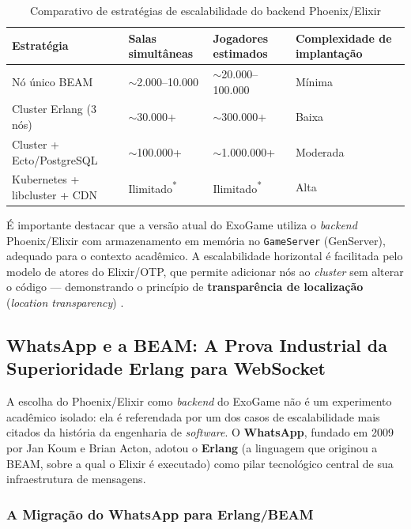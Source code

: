 \documentclass[
	12pt,
	openany,
	oneside,
	a4paper,
	english,
	brazil
]{abntex2}
\begin{document}
\begin{table}[htb]
\caption{\label{tab:escalabilidade}Comparativo de estratégias de escalabilidade do backend Phoenix/Elixir}
\begin{tabular}{p{3cm}|p{3cm}|p{3cm}|p{3.5cm}}
  \toprule
  \textbf{Estratégia} & \textbf{Salas simultâneas} & \textbf{Jogadores estimados} & \textbf{Complexidade de implantação} \\
  \midrule
  Nó único BEAM & $\sim$2.000--10.000 & $\sim$20.000--100.000 & Mínima \\
  \midrule
  Cluster Erlang (3 nós) & $\sim$30.000+ & $\sim$300.000+ & Baixa \\
  \midrule
  Cluster + Ecto/PostgreSQL & $\sim$100.000+ & $\sim$1.000.000+ & Moderada \\
  \midrule
  Kubernetes + libcluster + CDN & Ilimitado\textsuperscript{*} & Ilimitado\textsuperscript{*} & Alta \\
  \bottomrule
\end{tabular}
\end{table}

É importante destacar que a versão atual do ExoGame utiliza o \textit{backend} Phoenix/Elixir com armazenamento em memória no \texttt{GameServer} (GenServer), adequado para o contexto acadêmico. A escalabilidade horizontal é facilitada pelo modelo de atores do Elixir/OTP, que permite adicionar nós ao \textit{cluster} sem alterar o código --- demonstrando o princípio de \textbf{transparência de localização} (\textit{location transparency}) \cite{armstrong2013}.

\subsection{WhatsApp e a BEAM: A Prova Industrial da Superioridade Erlang para WebSocket}\label{sec:whatsapp}

A escolha do Phoenix/Elixir como \textit{backend} do ExoGame não é um experimento acadêmico isolado: ela é referendada por um dos casos de escalabilidade mais citados da história da engenharia de \textit{software}. O \textbf{WhatsApp}, fundado em 2009 por Jan Koum e Brian Acton, adotou o \textbf{Erlang} (a linguagem que originou a BEAM, sobre a qual o Elixir é executado) como pilar tecnológico central de sua infraestrutura de mensagens.

\subsubsection{A Migração do WhatsApp para Erlang/BEAM}
\end{document}
